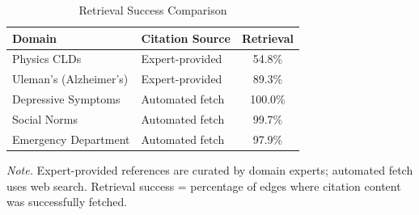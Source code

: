 \begin{table}[H]
\centering
\small
\begin{threeparttable}
\caption{Retrieval Success Comparison}
\label{tab:retrieval-comparison}
\begin{tabular}{llc}
\toprule
\textbf{Domain} & \textbf{Citation Source} & \textbf{Retrieval} \\
\midrule
Physics CLDs & Expert-provided & 54.8\% \\
Uleman's (Alzheimer's) & Expert-provided & 89.3\% \\
\midrule
Depressive Symptoms & Automated fetch & 100.0\% \\
Social Norms & Automated fetch & 99.7\% \\
Emergency Department & Automated fetch & 97.9\% \\
\bottomrule
\end{tabular}
\begin{tablenotes}
\small
\item \textit{Note.} Expert-provided references are curated by domain experts; automated fetch uses web search. Retrieval success = percentage of edges where citation content was successfully fetched.
\end{tablenotes}
\end{threeparttable}
\end{table}
